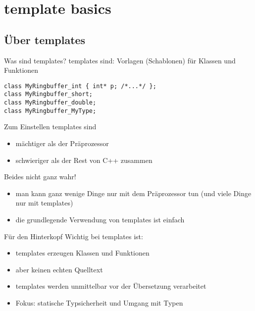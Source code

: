 \section{template basics}


\subsection{Über templates}

\begin{frame}[fragile]{Was sind templates?}
	templates sind: Vorlagen (Schablonen) für Klassen und Funktionen
	
	\pause
	\vspace{2em}
	
	
	
	\pause
	
	\begin{lstlisting}
class MyRingbuffer_int { int* p; /*...*/ };
class MyRingbuffer_short;
class MyRingbuffer_double;
class MyRingbuffer_MyType;
	\end{lstlisting}
\end{frame}


\begin{frame}{Zum Einstellen}
	templates sind
	\begin{itemize}
		\item mächtiger als der Präprozessor
		\item schwieriger als der Rest von C++ zusammen
	\end{itemize}
	
	\pause
	\vspace{1em}
	Beides nicht ganz wahr!
	\begin{itemize}
		\item man kann ganz wenige Dinge nur mit dem Präprozessor tun (und viele Dinge nur mit templates)
		\item die grundlegende Verwendung von templates ist einfach
	\end{itemize}
\end{frame}

\begin{frame}{Für den Hinterkopf}
	Wichtig bei templates ist:
	
	\begin{itemize}
		\item templates erzeugen Klassen und Funktionen
		\item aber keinen echten Quelltext
		\item templates werden unmittelbar vor der Übersetzung verarbeitet
		\item Fokus: statische Typsicherheit und Umgang mit Typen
	\end{itemize}
\end{frame}


